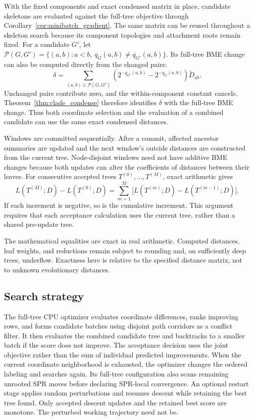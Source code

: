 \documentclass[11pt,a4paper]{article}
\makeatletter
\DeclareRobustCommand{\_}{\ifmmode\nfss@text{\textunderscore}\else\textunderscore\allowbreak\fi}
\theoremstyle{definition}
\makeatother
\begin{document}
With the fixed components and exact condensed matrix in place, candidate skeletons are evaluated against the full-tree objective through Corollary~\ref{cor:minibatch_gradient}.
The same matrix can be reused throughout a skeleton search because its component topologies and attachment roots remain fixed.
For a candidate $G'$, let $\mathcal P(G,G')=\{(a,b):a<b,\ q_G(a,b)\ne q_{G'}(a,b)\}$.
Its full-tree BME change can also be computed directly from the changed pairs:
\begin{equation}
 \delta=\sum_{(a,b)\in\mathcal P(G,G')}
   \left(2^{-q_{G'}(a,b)}-2^{-q_G(a,b)}\right)
   \widetilde D_{ab}.
 \label{eq:changed_pairs}
\end{equation}
Unchanged pairs contribute zero, and the within-component constant cancels.
Theorem~\ref{thm:clade_condense} therefore identifies $\delta$ with the full-tree BME change.
Thus both coordinate selection and the evaluation of a combined candidate can use the same exact condensed distances.

Windows are committed sequentially.
After a commit, affected ancestor summaries are updated and the next window's outside distances are constructed from the current tree.
Node-disjoint windows need not have additive BME changes because both updates can alter the coefficients of distances between their leaves.
For consecutive accepted trees $T^{(0)},\ldots,T^{(M)}$, exact arithmetic gives
\begin{equation}
 L(T^{(M)};D)-L(T^{(0)};D)
 =\sum_{m=1}^M\bigl[L(T^{(m)};D)-L(T^{(m-1)};D)\bigr].
 \label{eq:telescoping}
\end{equation}
If each increment is negative, so is the cumulative increment.
This argument requires that each acceptance calculation uses the current tree, rather than a shared pre-update tree.

The mathematical equalities are exact in real arithmetic.
Computed distances, leaf weights, and reductions remain subject to rounding and, on sufficiently deep trees, underflow.
Exactness here is relative to the specified distance matrix, not to unknown evolutionary distances.

\subsection{Search strategy}
\label{sec:optimizer}

The full-tree CPU optimizer evaluates coordinate differences, ranks improving rows, and forms candidate batches using disjoint path corridors as a conflict filter.
It then evaluates the combined candidate tree and backtracks to a smaller batch if the score does not improve.
The acceptance decision uses the joint objective rather than the sum of individual predicted improvements.
When the current coordinate neighborhood is exhausted, the optimizer changes the ordered labeling and searches again.
Its full-tree configuration also scans remaining unrooted SPR moves before declaring SPR-local convergence.
An optional restart stage applies random perturbations and resumes descent while retaining the best tree found.
Only accepted descent updates and the retained best score are monotone.
The perturbed working trajectory need not be.
\end{document}
